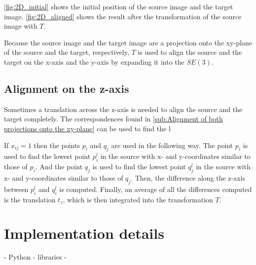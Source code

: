             \autoref{fig:2D_initial} shows the initial position of the source image and the target image.
            \autoref{fig:2D_aligned} shows the result after the transformation of the source image with $T$.

            Because the source image and the target image are a projection onto the xy-plane of the source and the target, respectively,
            $T$ is used to align the source and the target on the x-axis and the y-axis by expanding it into the $SE(3)$.

        \subsection{Alignment on the z-axis}
            Sometimes a translation across the z-axis is needed to align the source and the target completely.
            The correspondences found in \autoref{sub:Alignment of both projections onto the xy-plane} 
            can be used to find the l

            If $x_{ij} = 1$ then the points $p_i$ and $q_j$ are used in the following way.
            The point $p_i$ is used to find the lowest point $p_i^l$ in the source with x- and y-coordinates similar to those of $p_i$.
            And the point $q_j$ is used to find the lowest point $q_j^l$ in the source with x- and y-coordinates similar to those of $q_j$.
            Then, the difference along the z-axis between $p_i^l$ and $q_i^l$ is computed.
            Finally, an average of all the differences computed is the translation $t_z$, which is then integrated into the transformation $T$.

    \section{Implementation details}
        - Python
        - libraries
        - 


